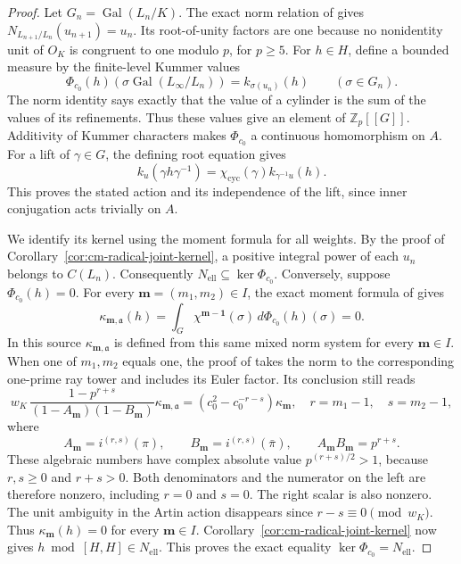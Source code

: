 \begin{proof}
Let \(G_n=\operatorname{Gal}(L_n/K)\).  The exact norm relation
of \cite[Proposition 2.5, p.~8]{IshiiSoule} gives
\(N_{L_{n+1}/L_n}(u_{n+1})=u_n\).  Its root-of-unity factors are
one because no nonidentity unit of \(O_K\) is congruent to one
modulo \(p\), for \(p\geq5\).
For \(h\in H\), define a bounded measure by the finite-level
Kummer values
\begin{equation}\label{eq:cm-mixed-measure}
 \Phi_{c_0}(h)(\sigma\operatorname{Gal}(L_\infty/L_n))
                      =k_{\sigma(u_n)}(h)\qquad(\sigma\in G_n).
\end{equation}
The norm identity says exactly that the value of a cylinder is
the sum of the values of its refinements.  Thus these values give
an element of \(\mathbb Z_p[[G]]\).  Additivity of Kummer characters
makes \(\Phi_{c_0}\) a continuous homomorphism on \(A\).
For a lift of \(\gamma\in G\), the defining root equation gives
\[
 k_u(\gamma h\gamma^{-1})
   =\chi_{\mathrm{cyc}}(\gamma)k_{\gamma^{-1}u}(h).
\]
This proves the stated action and its independence of the lift,
since inner conjugation acts trivially on \(A\).

We identify its kernel using the moment formula for all weights.  By the proof of
Corollary~\ref{cor:cm-radical-joint-kernel}, a positive integral
power of each \(u_n\) belongs to \(C(L_n)\).  Consequently
\(N_{\mathrm{ell}}\subseteq\ker\Phi_{c_0}\).
Conversely, suppose \(\Phi_{c_0}(h)=0\).
For every \(\boldsymbol m=(m_1,m_2)\in I\), the exact moment
formula of \cite[Lemma 4.2, p.~17]{IshiiSoule} gives
\[
 \kappa_{\boldsymbol m,\mathfrak a}(h)
   =\int_G\chi^{\boldsymbol m-\boldsymbol1}(\sigma)\,
                                 d\Phi_{c_0}(h)(\sigma)=0.
\]
In this source \(\kappa_{\boldsymbol m,\mathfrak a}\) is defined
from this same mixed norm system for every \(\boldsymbol m\in I\).
When one of \(m_1,m_2\) equals one, the proof of
\cite[Proposition 4.3, pp.~17--18]{IshiiSoule} takes the norm
to the corresponding one-prime ray tower and includes its Euler
factor.  Its conclusion still reads
\begin{equation}\label{eq:cm-mixed-all-weight-scalar}
 w_K\,\frac{1-p^{r+s}}{(1-A_{\boldsymbol m})(1-B_{\boldsymbol m})}
       \kappa_{\boldsymbol m,\mathfrak a}
    =(c_0^2-c_0^{-r-s})\kappa_{\boldsymbol m},
 \quad r=m_1-1,\quad s=m_2-1,
\end{equation}
where
\[
 A_{\boldsymbol m}=i^{(r,s)}(\pi),\qquad
 B_{\boldsymbol m}=i^{(r,s)}(\bar\pi),\qquad
 A_{\boldsymbol m}B_{\boldsymbol m}=p^{r+s}.
\]
These algebraic numbers have complex absolute value
\(p^{(r+s)/2}>1\), because \(r,s\geq0\) and \(r+s>0\).
Both denominators and the numerator on the left are therefore
nonzero, including \(r=0\) and \(s=0\).
The right scalar is also nonzero.  The unit ambiguity in the
Artin action disappears since \(r-s\equiv0\pmod{w_K}\).
Thus \(\kappa_{\boldsymbol m}(h)=0\) for every
\(\boldsymbol m\in I\).
Corollary~\ref{cor:cm-radical-joint-kernel} now gives
\(h\bmod[H,H]\in N_{\mathrm{ell}}\).
This proves the exact equality
\(\ker\Phi_{c_0}=N_{\mathrm{ell}}\).


\end{proof}
